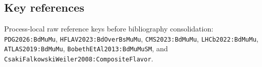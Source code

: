 \subsection*{Key references}
Process-local raw reference keys before bibliography consolidation:
\texttt{PDG2026:BdMuMu}, \texttt{HFLAV2023:BdOverBsMuMu},
\texttt{CMS2023:BdMuMu}, \texttt{LHCb2022:BdMuMu},
\texttt{ATLAS2019:BdMuMu}, \texttt{BobethEtAl2013:BdMuMuSM}, and
\texttt{CsakiFalkowskiWeiler2008:CompositeFlavor}.
